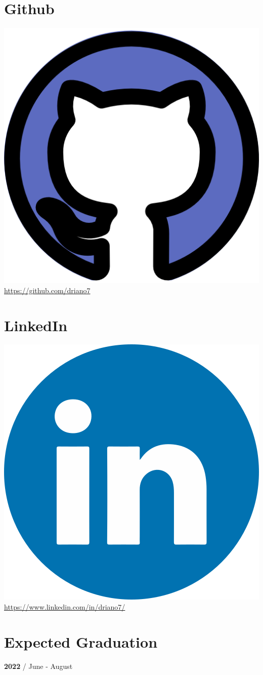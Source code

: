 \documentclass[]{friggeri-cv}
\begin{document}
\begin{aside}
    \section{Github}\includegraphics[scale=0.028]{logos/github.png}
    \url{https://github.com/driano7}
    ~
    \section{LinkedIn}\includegraphics[scale=0.028]{logos/linkedIN.png}
    \url{https://www.linkedin.com/in/driano7/}
    ~
    \section{Expected Graduation}
    \textbf{2022} / June - August 
    ~
     ~
\end{aside}
\end{document}
